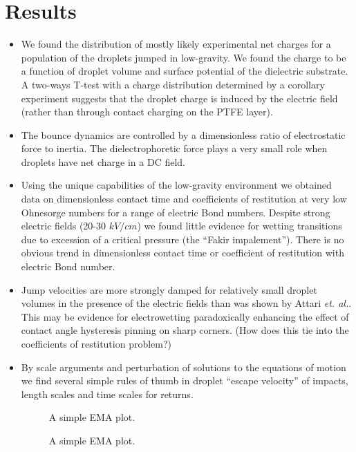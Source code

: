 \documentclass[a4paper, 12pt]{article}
\begin{document}
\section{Results}
\begin{itemize}
\item We found the distribution of mostly likely experimental net charges for a population of the droplets jumped in low-gravity. We found the charge to be a function of droplet volume and surface potential of the dielectric substrate. A two-ways T-test with a charge distribution determined by a corollary experiment suggests that the droplet charge is induced by the electric field (rather than through contact charging on the PTFE layer).

\item The bounce dynamics are controlled by a dimensionless ratio of electrostatic force to inertia. The dielectrophoretic force plays a very small role when droplets have net charge in a DC field.  

\item Using the unique capabilities of the low-gravity environment we obtained data on dimensionless contact time and coefficients of restitution at very low Ohnesorge numbers for a range of electric Bond numbers. Despite strong electric fields (20-30 $kV/cm$) we found little evidence for wetting transitions due to excession of a critical pressure (the ``Fakir impalement''). There is no obvious trend in dimensionless contact time or coefficient of restitution with electric Bond number.

\item Jump velocities are more strongly damped for relatively small droplet volumes in the presence of the electric fields than was shown by Attari \emph{et. al.}. This may be evidence for electrowetting paradoxically enhancing the effect of contact angle hysteresis pinning on sharp corners. (How does this tie into the coefficients of restitution problem?)

\item By scale arguments and perturbation of solutions to the equations of motion we find several simple rules of thumb in droplet ``escape velocity'' of impacts, length scales and time scales for returns.

\begin{figure}[htb]
    \centering
    
    \caption{A simple EMA plot.\label{fig:charge}}
\end{figure}

\begin{figure}[htb]
    \centering
    
    \caption{A simple EMA plot.\label{fig:series}}
\end{figure}


\end{itemize}
\end{document}
